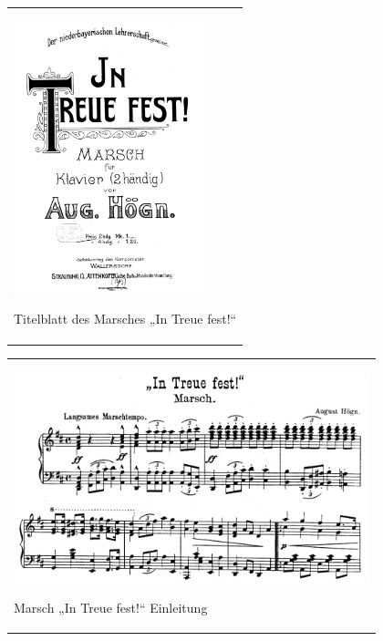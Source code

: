 \begin{center}
\begin{minipage}{5.884cm}
\begin{flushleft}
\tablefirsthead{}
\tablehead{}
\tabletail{}
\tablelasttail{}
\begin{supertabular}{m{5.684cm}}

\includegraphics[width=5.503cm,height=7.862cm]{pictures/zulassungsarbeit-img104.png}

Titelblatt des Marsches „In Treue
fest!“\\
\end{supertabular}
\end{flushleft}
\end{minipage}
\end{center}
\begin{center}
\tablefirsthead{}
\tablehead{}
\tabletail{}
\tablelasttail{}
\begin{supertabular}{m{10.502cm}}

\includegraphics[width=10.319cm,height=6.071cm]{pictures/zulassungsarbeit-img105.png}

Marsch „In Treue fest!“ Einleitung\\
\end{supertabular}
\end{center}
